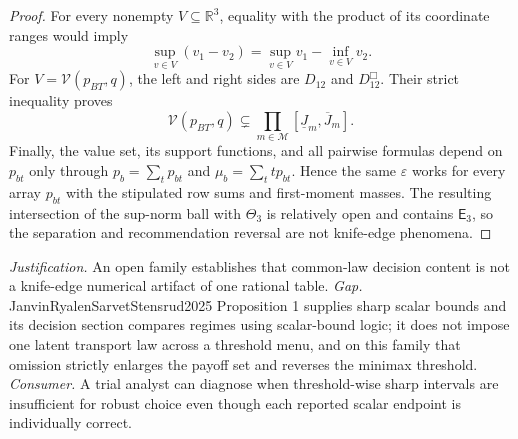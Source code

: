 \documentclass{article}
\begin{document}
\begin{proof}
For every nonempty \(V\subseteq\mathbb R^3\), equality with the product of its coordinate ranges would imply
\[
 \sup_{v\in V}(v_1-v_2)=\sup_{v\in V}v_1-\inf_{v\in V}v_2.               \tag{7}
\]
For \(V=\mathcal V(p_{BT},q)\), the left and right sides are \(D_{12}\) and \(D_{12}^{\Box}\).  Their strict inequality proves
\[
 \mathcal V(p_{BT},q)\subsetneq
 \prod_{m\in\mathcal M}[\underline J_m,\overline J_m].   \tag{8}
\]
Finally, the value set, its support functions, and all pairwise formulas depend on \(p_{bt}\) only through \(p_b=\sum_tp_{bt}\) and \(\mu_b=\sum_ttp_{bt}\).  Hence the same \(\varepsilon\) works for every array \(p_{bt}\) with the stipulated row sums and first-moment masses.  The resulting intersection of the sup-norm ball with \(\Theta_3\) is relatively open and contains \(\mathsf E_3\), so the separation and recommendation reversal are not knife-edge phenomena.
\end{proof}
\par\smallskip\noindent \textit{Justification.} An open family establishes that common-law decision content is not a knife-edge numerical artifact of one rational table. \textit{Gap.} JanvinRyalenSarvetStensrud2025 Proposition 1 supplies sharp scalar bounds and its decision section compares regimes using scalar-bound logic; it does not impose one latent transport law across a threshold menu, and on this family that omission strictly enlarges the payoff set and reverses the minimax threshold. \textit{Consumer.} A trial analyst can diagnose when threshold-wise sharp intervals are insufficient for robust choice even though each reported scalar endpoint is individually correct.
\end{document}
